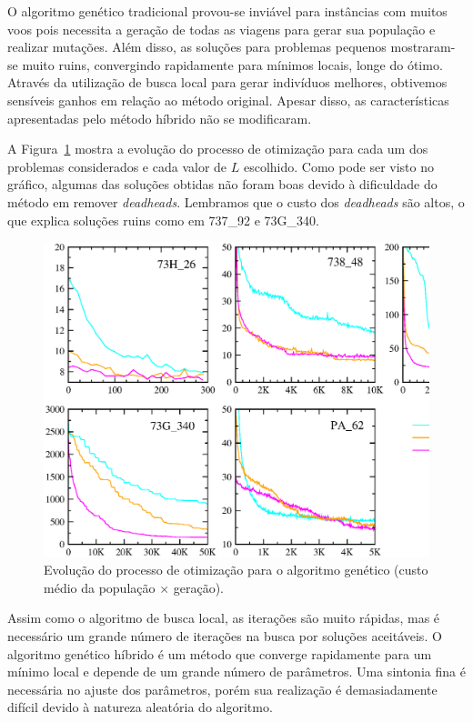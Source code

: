 O algoritmo genético tradicional provou-se inviável para instâncias com muitos voos pois necessita
a geração de todas as viagens para gerar sua população e realizar mutações. Além disso, as soluções
para problemas pequenos mostraram-se muito ruins, convergindo rapidamente para mínimos locais, longe
do ótimo. Através da utilização de busca local para gerar indivíduos melhores, obtivemos sensíveis
ganhos em relação ao método original. Apesar disso, as características apresentadas pelo método
híbrido não se modificaram. 

A Figura~\ref{fig:ga_results} mostra a evolução do processo de otimização para cada um dos problemas
considerados e cada valor de $L$ escolhido. Como pode ser visto no gráfico, algumas das soluções
obtidas não foram boas devido à dificuldade do método em remover {\it deadheads}. Lembramos que o
custo dos {\it deadheads} são altos, o que explica soluções ruins como em 737\_92 e 73G\_340.

\begin{figure}[htbp]
	\begin{center}
		\includegraphics[scale=0.5]{fig/genetic_results.eps}
		\caption{Evolução do processo de otimização para o algoritmo genético (custo médio da população
		$\times$ geração).}
		\label{fig:ga_results}
	\end{center}
\end{figure}

Assim como o algoritmo de busca local, as iterações são muito rápidas, mas é necessário um grande
número de iterações na busca por soluções aceitáveis. O algoritmo genético híbrido é um método que
converge rapidamente para um mínimo local e depende de um grande número de parâmetros. Uma sintonia
fina é necessária no ajuste dos parâmetros, porém sua realização é demasiadamente difícil devido à
natureza aleatória do algoritmo.


